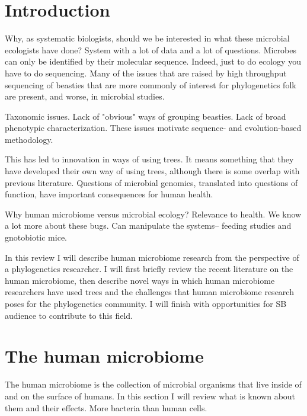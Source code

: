 \documentclass{amsart}
\begin{document}
\section{Introduction}

Why, as systematic biologists, should we be interested in what these microbial ecologists have done?
System with a lot of data and a lot of questions.
Microbes can only be identified by their molecular sequence.
Indeed, just to do ecology you have to do sequencing.
Many of the issues that are raised by high throughput sequencing of beasties that are more commonly of interest for phylogenetics folk are present, and worse, in microbial studies.

Taxonomic issues.
Lack of "obvious" ways of grouping beasties.
Lack of broad phenotypic characterization.
These issues motivate sequence- and evolution-based methodology.

This has led to innovation in ways of using trees.
It means something that they have developed their own way of using trees, although there is some overlap with previous literature.
Questions of microbial genomics, translated into questions of function, have important consequences for human health.

Why human microbiome versus microbial ecology?
Relevance to health.
We know a lot more about these bugs.
Can manipulate the systems-- feeding studies and gnotobiotic mice.

In this review I will describe human microbiome research from the perspective of a phylogenetics researcher.
I will first briefly review the recent literature on the human microbiome, then describe novel ways in which human microbiome researchers have used trees and the challenges that human microbiome research poses for the phylogenetics community.
I will finish with opportunities for SB audience to contribute to this field.

\section{The human microbiome}
The human microbiome is the collection of microbial organisms that live inside of and on the surface of humans.
In this section I will review what is known about them and their effects.
More bacteria than human cells.
\end{document}
